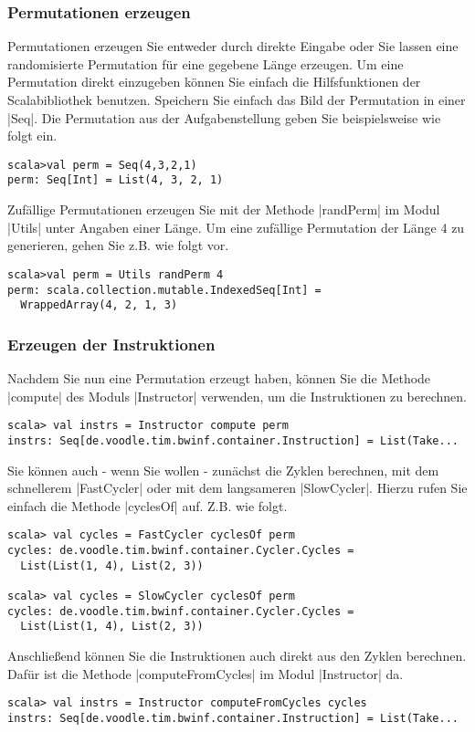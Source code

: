 \subsubsection{Permutationen erzeugen}
Permutationen erzeugen Sie entweder durch direkte Eingabe oder Sie lassen eine randomisierte Permutation für eine gegebene Länge erzeugen.
Um eine Permutation direkt einzugeben können Sie einfach die Hilfsfunktionen der Scalabibliothek benutzen.
Speichern Sie einfach das Bild der Permutation in einer |Seq|. Die Permutation aus der Aufgabenstellung geben Sie beispielsweise wie folgt ein.
\begin{lstlisting}
scala>val perm = Seq(4,3,2,1)
perm: Seq[Int] = List(4, 3, 2, 1)  
\end{lstlisting}
Zufällige Permutationen erzeugen Sie mit der Methode |randPerm| im Modul |Utils| unter Angaben einer Länge.
Um eine zufällige Permutation der Länge 4 zu generieren, gehen Sie z.B. wie folgt vor.
\begin{lstlisting}
scala>val perm = Utils randPerm 4                                                                                                 
perm: scala.collection.mutable.IndexedSeq[Int] =
  WrappedArray(4, 2, 1, 3)  
\end{lstlisting}
\subsubsection{Erzeugen der Instruktionen}
Nachdem Sie nun eine Permutation erzeugt haben, können Sie die Methode |compute| des Moduls |Instructor| verwenden, um die Instruktionen zu berechnen.
\begin{lstlisting}
scala> val instrs = Instructor compute perm
instrs: Seq[de.voodle.tim.bwinf.container.Instruction] = List(Take...
\end{lstlisting}
Sie können auch - wenn Sie wollen - zunächst die Zyklen berechnen, mit dem schnellerem |FastCycler| oder mit dem langsameren |SlowCycler|.
Hierzu rufen Sie einfach die Methode |cyclesOf| auf. Z.B. wie folgt.
\begin{lstlisting}
scala> val cycles = FastCycler cyclesOf perm
cycles: de.voodle.tim.bwinf.container.Cycler.Cycles =
  List(List(1, 4), List(2, 3))

scala> val cycles = SlowCycler cyclesOf perm
cycles: de.voodle.tim.bwinf.container.Cycler.Cycles =
  List(List(1, 4), List(2, 3))
\end{lstlisting}
Anschließend können Sie die Instruktionen auch direkt aus den Zyklen berechnen. Dafür ist die Methode |computeFromCycles| im Modul |Instructor| da.
\begin{lstlisting}
scala> val instrs = Instructor computeFromCycles cycles
instrs: Seq[de.voodle.tim.bwinf.container.Instruction] = List(Take...
\end{lstlisting}

